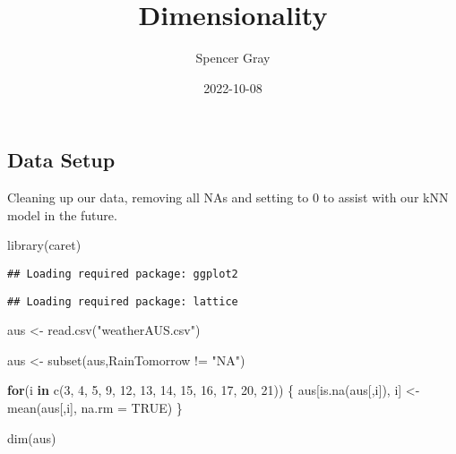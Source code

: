 \documentclass[
]{article}
\title{Dimensionality}
\author{Spencer Gray}
\date{2022-10-08}
\newenvironment{Shaded}{\begin{snugshade}}{\end{snugshade}}
\newcommand{\AttributeTok}[1]{\textcolor[rgb]{0.77,0.63,0.00}{#1}}
\newcommand{\ConstantTok}[1]{\textcolor[rgb]{0.00,0.00,0.00}{#1}}
\newcommand{\ControlFlowTok}[1]{\textcolor[rgb]{0.13,0.29,0.53}{\textbf{#1}}}
\newcommand{\DecValTok}[1]{\textcolor[rgb]{0.00,0.00,0.81}{#1}}
\newcommand{\FunctionTok}[1]{\textcolor[rgb]{0.00,0.00,0.00}{#1}}
\newcommand{\NormalTok}[1]{#1}
\newcommand{\OtherTok}[1]{\textcolor[rgb]{0.56,0.35,0.01}{#1}}
\newcommand{\SpecialCharTok}[1]{\textcolor[rgb]{0.00,0.00,0.00}{#1}}
\newcommand{\StringTok}[1]{\textcolor[rgb]{0.31,0.60,0.02}{#1}}
\begin{document}
\maketitle

\hypertarget{data-setup}{%
\subsection{Data Setup}\label{data-setup}}

Cleaning up our data, removing all NAs and setting to 0 to assist with
our kNN model in the future.

\begin{Shaded}
\begin{Highlighting}[]
\FunctionTok{library}\NormalTok{(caret)}
\end{Highlighting}
\end{Shaded}

\begin{verbatim}
## Loading required package: ggplot2
\end{verbatim}

\begin{verbatim}
## Loading required package: lattice
\end{verbatim}

\begin{Shaded}
\begin{Highlighting}[]
\NormalTok{aus }\OtherTok{\textless{}{-}} \FunctionTok{read.csv}\NormalTok{(}\StringTok{"weatherAUS.csv"}\NormalTok{)}

\NormalTok{aus }\OtherTok{\textless{}{-}} \FunctionTok{subset}\NormalTok{(aus,RainTomorrow  }\SpecialCharTok{!=} \StringTok{"NA"}\NormalTok{)}

\ControlFlowTok{for}\NormalTok{(i }\ControlFlowTok{in} \FunctionTok{c}\NormalTok{(}\DecValTok{3}\NormalTok{, }\DecValTok{4}\NormalTok{, }\DecValTok{5}\NormalTok{, }\DecValTok{9}\NormalTok{, }\DecValTok{12}\NormalTok{, }\DecValTok{13}\NormalTok{, }\DecValTok{14}\NormalTok{, }\DecValTok{15}\NormalTok{, }\DecValTok{16}\NormalTok{, }\DecValTok{17}\NormalTok{, }\DecValTok{20}\NormalTok{, }\DecValTok{21}\NormalTok{))}
\NormalTok{\{}
\NormalTok{  aus[}\FunctionTok{is.na}\NormalTok{(aus[,i]), i] }\OtherTok{\textless{}{-}} \FunctionTok{mean}\NormalTok{(aus[,i], }\AttributeTok{na.rm =} \ConstantTok{TRUE}\NormalTok{)}
\NormalTok{\}}


\FunctionTok{dim}\NormalTok{(aus)}
\end{Highlighting}
\end{Shaded}
\end{document}
